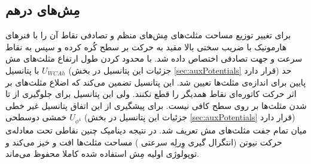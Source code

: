 \subsection{
مِش‌های درهم
}
برای تغییر توزیع مساحت مثلث‌های مِش‌های منظم و تصادفی‌  نقاط آن را با فنر‌های هارمونیک با ضریب سختی بالا مقید به حرکت بر سطح کُره کرده و سپس به نقاط سرعت و جهت تصادفی اختصاص داده شد. با محدود کردن طول ارتفاع مثلث‌های مش با پتانسیل 
$U_{WCAh}$
(جزئیات این پتانسیل در بخش 
\ref{sec:auxPotentials}
قرار دارد) حد پایین برای اندازه‌ی مثلث‌ها تعیین شد. این پتانسیل تضمین می‌کند که اضلاع مثلث‌های بر اثر حرکت کاتوره‌ای نقاط همدیگر را قطع نکنند. ولی این پتانسیل برای جلوگیری از تا شدن مثلث‌ها بر روی سطح کافی نیست. برای پیشگیری از این اتفاق پتانسیل غیر خطی خمشی دوسطحی
$U_{\phi^4}$
(جزئیات این پتانسیل در بخش 
\ref{sec:auxPotentials}
قرار دارد) میان تمام جفت مثلث‌های مش تعریف شد. در نتیجه دینامیک چنین نقاطی تحت معادله‌ی حرکت نیوتن (انتگرال گیری وِرلِه سرعتی
) مساحت‌ مثلث‌ها افت و خیز می‌کند و توپولوژی اولیه مِش استفاده شده کاملا محفوظ می‌ماند.
 




